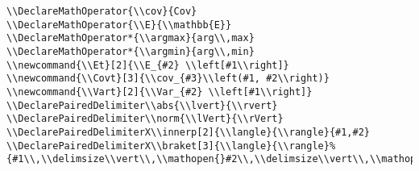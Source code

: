 \documentclass[c]{article}
\DeclareMathOperator{\Var}{Var}
\DeclareMathOperator{\cov}{Cov}
\DeclareMathOperator{\E}{\mathbb{E}}
\DeclareMathOperator*{\argmax}{arg\,max}
\DeclareMathOperator*{\argmin}{arg\,min}
\newcommand{\Et}[2]{\E_{#2} \left[#1\right]}
\newcommand{\Covt}[3]{\cov_{#3}\left(#1, #2\right)}
\newcommand{\Vart}[2]{\Var_{#2} \left[#1\right]}
\DeclarePairedDelimiter\abs{\lvert}{\rvert}
\DeclarePairedDelimiter\norm{\lVert}{\rVert}
\theoremstyle{plain}%
\theoremstyle{definition}
\theoremstyle{remark}
\begin{document}
\begin{verbatim}
\\DeclareMathOperator{\\cov}{Cov}
\\DeclareMathOperator{\\E}{\\mathbb{E}}
\\DeclareMathOperator*{\\argmax}{arg\\,max}
\\DeclareMathOperator*{\\argmin}{arg\\,min}
\\newcommand{\\Et}[2]{\\E_{#2} \\left[#1\\right]}
\\newcommand{\\Covt}[3]{\\cov_{#3}\\left(#1, #2\\right)}
\\newcommand{\\Vart}[2]{\\Var_{#2} \\left[#1\\right]}
\\DeclarePairedDelimiter\\abs{\\lvert}{\\rvert}
\\DeclarePairedDelimiter\\norm{\\lVert}{\\rVert}
\\DeclarePairedDelimiterX\\innerp[2]{\\langle}{\\rangle}{#1,#2}
\\DeclarePairedDelimiterX\\braket[3]{\\langle}{\\rangle}%
{#1\\,\\delimsize\\vert\\,\\mathopen{}#2\\,\\delimsize\\vert\\,\\mathopen{}#3}

\end{verbatim}
\end{document}
